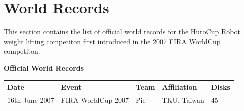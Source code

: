 \documentclass[12pt]{hurocup}
\begin{document}
\section{World Records}
\label{sec:worldrecords}

This section contains the list of official world records for the
HuroCup Robot weight lifting competiton first introduced in the 2007
FIRA WorldCup competiton.

\begin{center}
\textbf{Official World Records}
\end{center}

\begin{tabular}{|lllll|}
Date & Event & Team & Affiliation & Disks \\
\hline
16th June 2007 & FIRA WorldCup 2007 & Pie      & TKU, Taiwan    & 45  \\
\hline
\end{tabular}
\end{document}
